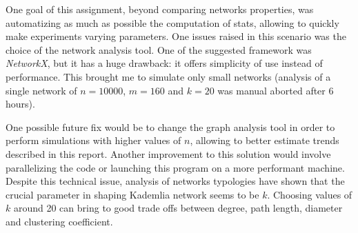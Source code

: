 \documentclass[12pt]{article}
\begin{document}
One goal of this assignment, beyond comparing networks properties, was automatizing as much as possible the computation of stats, allowing to quickly make experiments varying parameters. One issues raised in this scenario was the choice of the network analysis tool. One of the suggested framework was \textit{NetworkX}, but it has a huge drawback: it offers simplicity of use instead of performance. This brought me to simulate only small networks (analysis of a single network of $n=10000$, $m=160$ and $k=20$ was manual aborted after 6 hours). 

One possible future fix would be to change the graph analysis tool in order to perform simulations with higher values of $n$, allowing to better estimate trends described in this report. Another improvement to this solution would involve parallelizing the code or launching this program on a more performant machine. \\

\noindent
Despite this technical issue, analysis of networks typologies have shown that the crucial parameter in shaping Kademlia network seems to be $k$. Choosing values of $k$ around 20 can bring to good trade offs between degree, path length, diameter and clustering coefficient. 

 
 
\end{document}
